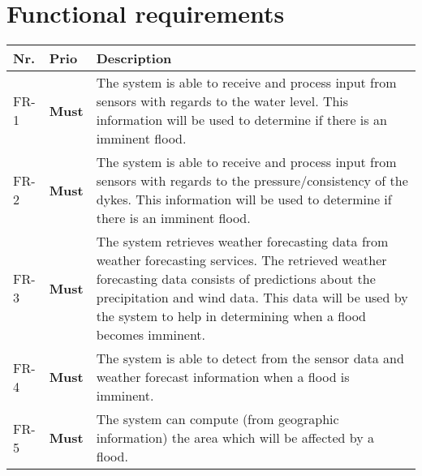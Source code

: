 \section{Functional requirements}
\begin{longtable}{p{} p{} p{}}

% 
    \textbf{Nr.} & \textbf{Prio}  & \textbf{Description} \\
    
    \hline {} \label{fr:1} FR-1 & 
      \textbf{Must} &
      The system is able to receive and process input from sensors with regards to the water level. This information will be used to determine if there is an imminent flood. \\

    \hline {} \label{fr:2} FR-2 & 
      \textbf{Must} &
      The system is able to receive and process input from sensors with regards to the pressure/consistency of the dykes. This information will be used to determine if there is an imminent flood. \\
    
    \hline {} \label{fr:3} FR-3 & 
      \textbf{Must} &
      The system retrieves weather forecasting data from weather forecasting services. The retrieved weather forecasting data consists of predictions about the precipitation and wind data. This data will be used by the system to help in determining when a flood becomes imminent.
     \\
     
    \hline {} \label{fr:4} FR-4 & 
      \textbf{Must} &
      The system is able to detect from the sensor data and weather forecast information when a flood is imminent. \\ %
    
    \hline {} \label{fr:5} FR-5 & 
      \textbf{Must} &
     The system can compute (from geographic information) the area which will be affected by a flood. \\


\end{longtable}
